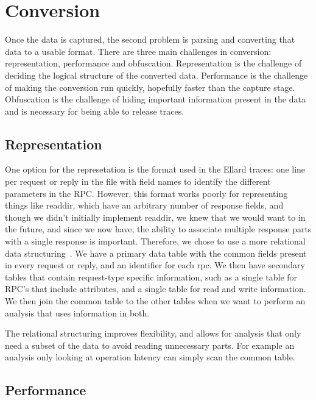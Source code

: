\section{Conversion}

Once the data is captured, the second problem is parsing and
converting that data to a usable format.  There are three main
challenges in conversion: representation, performance and obfuscation.
Representation is the challenge of deciding the logical structure of
the converted data.  Performance is the challenge of making the
conversion run quickly, hopefully faster than the capture stage.
Obfuscation is the challenge of hiding important information present
in the data and is necessary for being able to release traces.


\subsection{Representation}

One option for the represetation is the format used in the
Ellard\cite{ellardTraces} traces: one line per request or reply in the
file with field names to identify the different parameters in the RPC.
However, this format works poorly for representing things like
readdir, which have an arbitrary number of response fields, and though
we didn't initially implement readdir, we knew that we would want to
in the future, and since we now have, the ability to associate
multiple response parts with a single response is important.
Therefore, we chose to use a more relational data
structuring~\cite{codd70relational}.  We have a primary data table
with the common fields present in every request or reply, and an
identifier for each rpc.  We then have secondary tables that contain
request-type specific information, such as a single table for RPC's
that include attributes, and a single table for read and write
information.  We then join the common table to the other tables when
we want to perform an analysis that uses information in both.

The relational structuring improves flexibility, and allows for
analysis that only need a subset of the data to avoid reading
unnecessary parts.  For example an analysis only looking at operation
latency can simply scan the common table.

\subsection{Performance}

